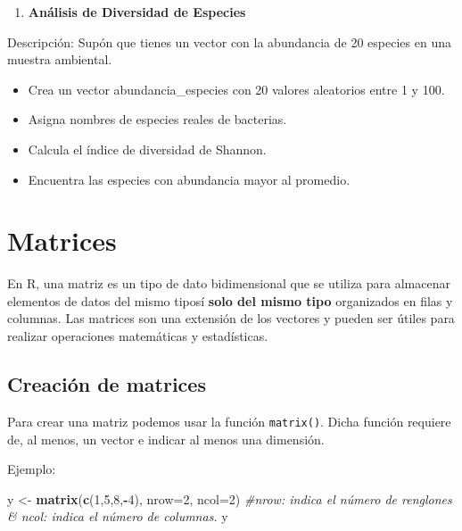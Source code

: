 \documentclass[
]{book}
\newenvironment{Shaded}{\begin{snugshade}}{\end{snugshade}}
\newcommand{\AttributeTok}[1]{\textcolor[rgb]{0.13,0.29,0.53}{#1}}
\newcommand{\CommentTok}[1]{\textcolor[rgb]{0.56,0.35,0.01}{\textit{#1}}}
\newcommand{\DecValTok}[1]{\textcolor[rgb]{0.00,0.00,0.81}{#1}}
\newcommand{\FunctionTok}[1]{\textcolor[rgb]{0.13,0.29,0.53}{\textbf{#1}}}
\newcommand{\NormalTok}[1]{#1}
\newcommand{\OtherTok}[1]{\textcolor[rgb]{0.56,0.35,0.01}{#1}}
\newcommand{\SpecialCharTok}[1]{\textcolor[rgb]{0.81,0.36,0.00}{\textbf{#1}}}
\providecommand{\tightlist}{%
  \setlength{\itemsep}{0pt}\setlength{\parskip}{0pt}}
\begin{document}
\begin{enumerate}
\def\labelenumi{\arabic{enumi}.}
\setcounter{enumi}{9}
\tightlist
\item
  \textbf{Análisis de Diversidad de Especies}
\end{enumerate}

Descripción: Supón que tienes un vector con la abundancia de 20 especies en una muestra ambiental.

\begin{itemize}
\tightlist
\item
  Crea un vector abundancia\_especies con 20 valores aleatorios entre 1 y 100.
\item
  Asigna nombres de especies reales de bacterias.
\item
  Calcula el índice de diversidad de Shannon.
\item
  Encuentra las especies con abundancia mayor al promedio.
\end{itemize}

\chapter{Matrices}\label{matrices}

En R, una matriz es un tipo de dato bidimensional que se utiliza para almacenar elementos de datos del mismo tiposí \textbf{solo del mismo tipo} organizados en filas y columnas.
Las matrices son una extensión de los vectores y pueden ser útiles para realizar operaciones matemáticas y estadísticas.

\section{Creación de matrices}\label{creaciuxf3n-de-matrices}

Para crear una matriz podemos usar la función \texttt{matrix()}. Dicha función requiere de, al menos, un vector e indicar al menos una dimensión.

Ejemplo:

\begin{Shaded}
\begin{Highlighting}[]
\NormalTok{y }\OtherTok{\textless{}{-}} \FunctionTok{matrix}\NormalTok{(}\FunctionTok{c}\NormalTok{(}\DecValTok{1}\NormalTok{,}\DecValTok{5}\NormalTok{,}\DecValTok{8}\NormalTok{,}\SpecialCharTok{{-}}\DecValTok{4}\NormalTok{), }\AttributeTok{nrow=}\DecValTok{2}\NormalTok{, }\AttributeTok{ncol=}\DecValTok{2}\NormalTok{) }\CommentTok{\#nrow: indica el número de renglones \& ncol: indica el número de columnas. }
\NormalTok{y}
\end{Highlighting}
\end{Shaded}
\end{document}
